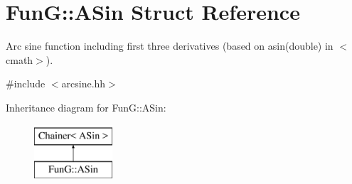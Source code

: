 \hypertarget{structFunG_1_1ASin}{\section{Fun\-G\-:\-:A\-Sin Struct Reference}
\label{structFunG_1_1ASin}
}


Arc sine function including first three derivatives (based on asin(double) in $<$cmath$>$).  




{\ttfamily \#include $<$arcsine.\-hh$>$}

Inheritance diagram for Fun\-G\-:\-:A\-Sin\-:\begin{figure}[H]
\begin{center}
\leavevmode
\includegraphics[height=2.000000cm]{structFunG_1_1ASin}
\end{center}
\end{figure}
